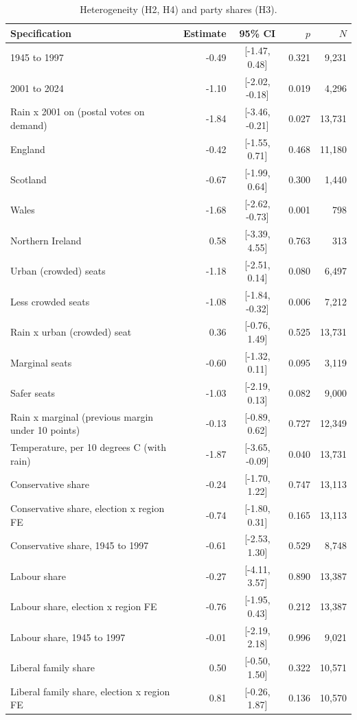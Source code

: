 \documentclass[11pt,a4paper]{article}
\begin{document}
\begin{table}[tbp]\centering\small\caption{Heterogeneity (H2, H4) and party shares (H3).}\label{tab:het}
\begin{tabular}{p{7.6cm}rcrr}\toprule Specification & Estimate & 95\% CI & $p$ & $N$\\\midrule
1945 to 1997 & -0.49 & [-1.47, 0.48] & 0.321 & 9,231\\
2001 to 2024 & -1.10 & [-2.02, -0.18] & 0.019 & 4,296\\
Rain x 2001 on (postal votes on demand) & -1.84 & [-3.46, -0.21] & 0.027 & 13,731\\
England & -0.42 & [-1.55, 0.71] & 0.468 & 11,180\\
Scotland & -0.67 & [-1.99, 0.64] & 0.300 & 1,440\\
Wales & -1.68 & [-2.62, -0.73] & 0.001 & 798\\
Northern Ireland & 0.58 & [-3.39, 4.55] & 0.763 & 313\\
Urban (crowded) seats & -1.18 & [-2.51, 0.14] & 0.080 & 6,497\\
Less crowded seats & -1.08 & [-1.84, -0.32] & 0.006 & 7,212\\
Rain x urban (crowded) seat & 0.36 & [-0.76, 1.49] & 0.525 & 13,731\\
Marginal seats & -0.60 & [-1.32, 0.11] & 0.095 & 3,119\\
Safer seats & -1.03 & [-2.19, 0.13] & 0.082 & 9,000\\
Rain x marginal (previous margin under 10 points) & -0.13 & [-0.89, 0.62] & 0.727 & 12,349\\
Temperature, per 10 degrees C (with rain) & -1.87 & [-3.65, -0.09] & 0.040 & 13,731\\
\midrule
Conservative share & -0.24 & [-1.70, 1.22] & 0.747 & 13,113\\
Conservative share, election x region FE & -0.74 & [-1.80, 0.31] & 0.165 & 13,113\\
Conservative share, 1945 to 1997 & -0.61 & [-2.53, 1.30] & 0.529 & 8,748\\
Labour share & -0.27 & [-4.11, 3.57] & 0.890 & 13,387\\
Labour share, election x region FE & -0.76 & [-1.95, 0.43] & 0.212 & 13,387\\
Labour share, 1945 to 1997 & -0.01 & [-2.19, 2.18] & 0.996 & 9,021\\
Liberal family share & 0.50 & [-0.50, 1.50] & 0.322 & 10,571\\
Liberal family share, election x region FE & 0.81 & [-0.26, 1.87] & 0.136 & 10,570\\

\end{tabular}
\end{table}
\end{document}
